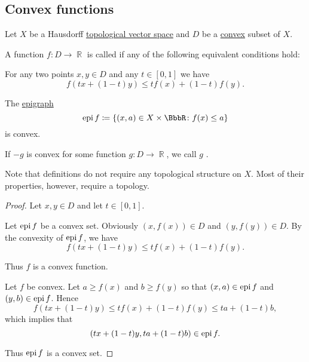 \subsection{Convex functions}\label{subsec:convex_functions}

Let \( X \) be a Hausdorff \hyperref[def:topological_vector_space]{topological vector space} and \( D \) be a \hyperref[def:convex_set]{convex} subset of \( X \).

\begin{definition}\label{def:convex_functions}
  A function \( f: D \to \BbbR \) is called  if any of the following equivalent conditions hold:

  \begin{defenum}
     For any two points \( x, y \in D \) and any \( t \in [0, 1] \) we have
    \begin{equation*}
      f(tx + (1-t)y) \leq tf(x) + (1-t)f(y).
    \end{equation*}

     The \hyperref[def:epigraph]{epigraph}
    \begin{equation*}
      \epi f \coloneqq \{ (x, a) \in X \times \BbbR \colon f(x) \leq a \}
    \end{equation*}
    is convex.
  \end{defenum}

  If \( -g \) is convex for some function \( g: D \to \BbbR \), we call \( g \) .

  Note that definitions do not require any topological structure on \( X \). Most of their properties, however, require a topology.
\end{definition}
\begin{proof}
  Let \( x, y \in D \) and let \( t \in [0, 1] \).

   Let \( \operatorname{epi} f \) be a convex set. Obviously \( (x, f(x)) \in D \) and \( (y, f(y)) \in D \). By the convexity of \( \operatorname{epi} f \), we have
  \begin{equation*}
    f(tx + (1-t)y) \leq tf(x) + (1-t)f(y).
  \end{equation*}

  Thus \( f \) is a convex function.

   Let \( f \) be convex. Let \( a \geq f(x) \) and \( b \geq f(y) \) so that \( (x, a) \in \operatorname{epi} f \) and \( (y, b) \in \operatorname{epi} f \). Hence
  \begin{equation*}
    f(tx + (1-t)y) \leq tf(x) + (1-t)f(y) \leq ta + (1-t)b,
  \end{equation*}
  which implies that
  \begin{equation*}
    (tx + (1-t)y, ta + (1-t)b) \in \operatorname{epi} f.
  \end{equation*}

  Thus \( \operatorname{epi} f \) is a convex set.
\end{proof}

